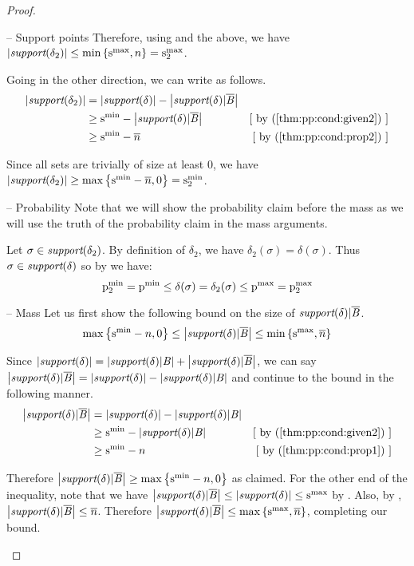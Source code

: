 \begin{proof}
\begin{subproof}{ -- Support points}
Therefore, using  and the above, we have
$ \left| \textit{support}(\delta_2) \right| \leq \min\left\{ \mathrm{s}^\mathrm{max}_{}, n \right\} = \mathrm{s}^\mathrm{max}_{2} $.

Going in the other direction, we can write as follows.
\begin{align*}
\setsize{\supdn} & = \setsize{\supd} - \setsize{\supout} \\
 & \geq \smin{} - \setsize{\supout}
 & \mathstep{by \cnumref{thm:pp:cond:given2}} \\
 & \geq \smin{} - \nn & \mathstep{by \cnumref{thm:pp:cond:prop2}}
\end{align*}

Since all sets are trivially of size at least $ 0 $, we have
$ \left| \textit{support}(\delta_2) \right| \geq \max\left\{ \mathrm{s}^\mathrm{min}_{} - \overline{n}, 0 \right\} = \mathrm{s}^\mathrm{min}_{2} $.
\end{subproof}

\begin{subproof}{ -- Probability} Note that we will show
the probability claim before the mass as we will use the truth of the
probability claim in the mass arguments.

Let $ \sigma \in \textit{support}(\delta_2) $. By definition of $ \delta_2 $, we have
$ \delta_2(\sigma) = \delta(\sigma) $. Thus $ \sigma \in \textit{support}(\delta) $ so
by  we have:
$$ \mathrm{p}^\mathrm{min}_{2} = \mathrm{p}^\mathrm{min}_{} \leq \delta(\sigma) = \delta_2(\sigma) \leq \mathrm{p}^\mathrm{max}_{} = \mathrm{p}^\mathrm{max}_{2} $$
\end{subproof}

\begin{subproof}{ -- Mass} Let us first show the
following bound on the size of $ \textit{support}(\delta) | \overline{\mathit{B}} $.
\begin{align}
\label{thm:pp:cond:prop1c} \maxparen{\smin{} - n,
0} \leq \setsize{\supout} \leq \minparen{\smax{}, \nn}
\end{align}

Since $ \left| \textit{support}(\delta) \right| = \left| \textit{support}(\delta) | \mathit{B} \right| + \left| \textit{support}(\delta) | \overline{\mathit{B}} \right| $, we
can say $ \left| \textit{support}(\delta) | \overline{\mathit{B}} \right| = \left| \textit{support}(\delta) \right| - \left| \textit{support}(\delta) | \mathit{B} \right| $ and
continue to the bound in the following manner.
\begin{align*}
\setsize{\supout} & = \setsize{\supd} - \setsize{\supin} \\
& \geq \smin{} - \setsize{\supin}
& \mathstep{by \cnumref{thm:pp:cond:given2}} \\
& \geq \smin{} - n & \mathstep{by \cnumref{thm:pp:cond:prop1}}
\end{align*}

Therefore $ \left| \textit{support}(\delta) | \overline{\mathit{B}} \right| \geq \max\left\{ \mathrm{s}^\mathrm{min}_{} - n, 0 \right\} $ as
claimed. For the other end of the inequality, note that we have
$ \left| \textit{support}(\delta) | \overline{\mathit{B}} \right| \leq \left| \textit{support}(\delta) \right| \leq \mathrm{s}^\mathrm{max}_{} $
by . Also,
by , $ \left| \textit{support}(\delta) | \overline{\mathit{B}} \right| \leq \overline{n} $. Therefore
$ \left| \textit{support}(\delta) | \overline{\mathit{B}} \right| \leq \max\left\{ \mathrm{s}^\mathrm{max}_{}, \overline{n} \right\} $, completing our
bound.


\end{subproof}
\end{proof}
